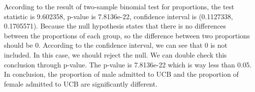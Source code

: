 \documentclass[]{article}
\begin{document}
According to the result of two-sample binomial test for proportions, the
test statistic is 9.602358, p-value is 7.8136e-22, confidence interval
is (0.1127338, 0.1705571). Because the null hypothesis states that there
is no differences between the proportions of each group, so the
difference between two proportions should be 0. According to the
confidence interval, we can see that 0 is not included. In this case, we
should reject the null. We can double check this conclusion through
p-value. The p-value is 7.8136e-22 which is way less than 0.05. In
conclusion, the proportion of male admitted to UCB and the proportion of
female admitted to UCB are significantly different.
\end{document}
